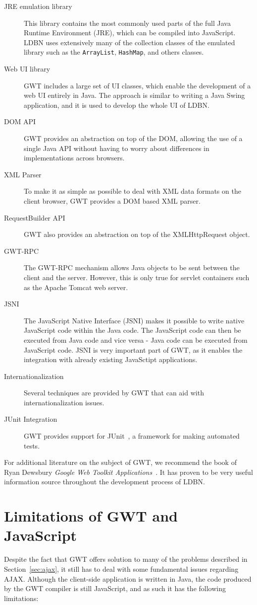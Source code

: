 \begin{description}
	\item[JRE emulation library] This library contains 
	the most commonly used parts of the full Java Runtime Environment (JRE), 
	which can be compiled into JavaScript. LDBN uses extensively many of the collection 
	classes of the emulated library such as the \verb=ArrayList=, \verb=HashMap=, 
	and others classes.
	\item[Web UI library] GWT includes a large set of UI classes, which 
	enable the development of a web UI entirely in Java. The approach is similar 
	to writing a Java Swing application, and it is used to develop the whole UI 
	of LDBN. 
	\item[DOM API] GWT provides an abstraction on top of the DOM, 
	allowing the use of a single Java API without having to worry about 
	differences in implementations across browsers.
	\item[XML Parser] To make it as simple as possible to deal with XML data formats 
	on the client browser, GWT provides a DOM based XML parser.
	\item[RequestBuilder API] GWT also provides an abstraction on top of the
	XMLHttpRequest object. 
	\item[GWT-RPC] The GWT-RPC mechanism allows Java objects to be sent between 
	the client and the server. However, this is only true for 
	servlet containers such as the Apache Tomcat web server. 
	\item[JSNI] The JavaScript Native Interface (JSNI) makes it possible to
	write native JavaScript code within the Java code. The JavaScript code can 
	then be executed from Java code and vice versa - Java code can be executed
	from JavaScript code. JSNI is very important part of GWT, as it enables 
	the integration with already existing JavaSctipt applications.  
	\item[Internationalization] Several techniques are provided by GWT that can 
	aid with internationalization issues.
	\item[JUnit Integration] GWT provides support for JUnit~\cite{wjunit}, 
	a framework for making automated tests.
\end{description}

For additional literature on the subject of GWT, we recommend the book of 
Ryan Dewsbury \textit{Google Web Toolkit Applications}~\cite{bgwt2}. It has
proven to be very useful information source throughout the development process 
of LDBN.  

\section{Limitations of GWT and JavaScript}
Despite the fact that GWT offers solution to many of the problems
described in Section~\ref{sec:ajax}, it still has to deal with some 
fundamental issues regarding 
AJAX. Although the client-side application is written in Java, 
the code produced by the GWT compiler is still JavaScript, and
as such it has the following limitations:
   
